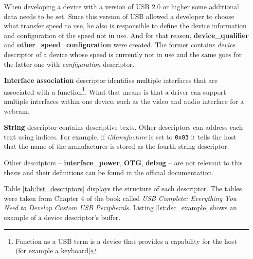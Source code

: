 When developing a device with a version of USB 2.0 or higher some additional data needs to be set. Since this version of USB allowed a developer to choose what transfer speed to use, he also is responsible to define the device information and configuration of the speed not in use. And for that reason, \textbf{device\_qualifier} and \textbf{other\_speed\_configuration} were created. The former contains \emph{device} descriptor of a device whose speed is currently not in use and the same goes for the latter one with \emph{configuration} descriptor. 

\textbf{Interface association} descriptor identifies multiple interfaces that are associated with a function\footnote{Function as a USB term is a device that provides a capability for the host (for example a keyboard)}. What that means is that a driver can support multiple interfaces within one device, such as the video and audio interface for a webcam. 

\textbf{String} descriptor contains descriptive texts. Other descriptors can address each text using indices. For example, if \emph{iManufacture} is set to \verb|0x03| it tells the host that the name of the manufacturer is stored as the fourth string descriptor. 

Other descriptors \--- \textbf{interface\_power}, \textbf{OTG}, \textbf{debug} \--- are not relevant to this thesis and their definitions can be found in the official documentation.

Table \ref{tab:list_descriptors} displays the structure of each descriptor. The tables were taken from Chapter 4 of the book called \emph{USB Complete: Everything You Need to Develop Custom USB Peripherals}. Listing \ref{lst:dsc_example} shows an example of a device descriptor's buffer.

